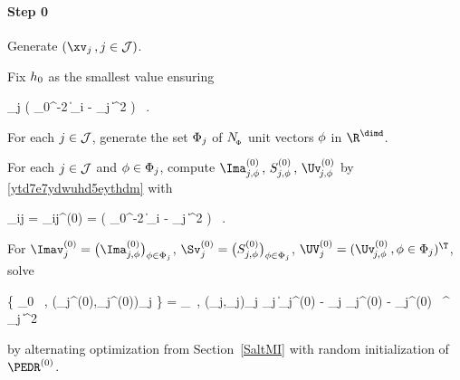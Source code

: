 \paragraph{Step 0}
\begin{mylist}
\item
Generate \( (\xv_{j} \, , j \in \JJJ) \).

\item
Fix \( h_{0} \) as the smallest value ensuring
\begin{EQA}[c]
	 \sum_{j \in \JJJ} 
	\sumi \Kern\bigl( \hiso_{0}^{-2} \| \Xv_{i} - \xv_{j} \|^{2} \bigr)
	\geq 
	\nmin
	\, .
\end{EQA}

\item
For each \( j \in \mathcal{J} \), generate the set \( \Phi_{j} \) of \( N_{_{\! \Phi}} \) unit vectors \( \phi \) in \( \R^{\dimd} \).

\item 
For each \( j \in \mathcal{J} \) and \( \phi \in \Phi_{j} \), compute  
\( \Ima_{j,\sph}^{(0)} \, , \, S_{j,\sph}^{(0)} \, , \, \Uv_{\jm,\sph}^{(0)} \)
by \eqref{ytd7e7ydwuhd5eythdm} with 
\begin{EQA}[c]
	\weight_{ij} 
	= 
	\weight_{ij}^{(0)}
	= 
	\Kern\bigl( \hiso_{0}^{-2} \| \Xv_{i} - \xv_{j} \|^{2} \bigr) 
	\, .
\end{EQA}

\item 
For
\( \Imav_{j}^{(0)} = \bigl( \Ima_{j,\sph}^{(0)} \bigr)_{\sph \in \Sph_{j}} \),
\( \Sv_{j}^{(0)} = \bigl( S_{j,\sph}^{(0)} \bigr)_{\sph \in \Sph_{j}} \),
\( \UV_{j}^{(0)} = (\Uv_{\jm,\sph}^{(0)} \, , \sph \in \Sph_{j})^{\T} \),
solve 
\begin{EQA}[c]
	\{ \PEDR_{0} \, , (\fcn_{j}^{(0)},\fclv_{j}^{(0)})_{j \in \JJJ} \} 
	= 
	\arginf_{\PEDR \, , (\fcn_{j},\fclv_{j})_{j \in \JJJ}} 
	\sum_{j \in \JJJ} \bigl\| \Imav_{j}^{(0)} - \fcn_{j} \Sv_{j}^{(0)} - \UV_{j}^{(0)} \, \PEDR^{\T} \fclv_{j} \bigr\|^{2}
	\, 
	\qquad
\label{jhvihjikr545yhvcvv}
\end{EQA}
by alternating optimization from Section~\ref{SaltMI} with random initialization of \( \PEDR^{(0)} \). 


\end{mylist}
